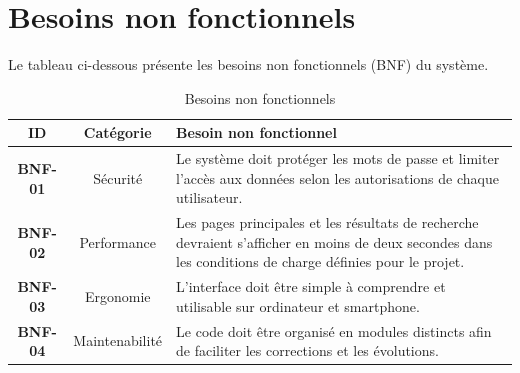\section{Besoins non fonctionnels}

Le tableau ci-dessous présente les besoins non fonctionnels (BNF) du système.

\begin{table}[ht]
\centering
\renewcommand{\arraystretch}{1.25}
\begin{tabularx}{\textwidth}{>{\bfseries}c c X}
\toprule
\textbf{ID} & \textbf{Catégorie} & \textbf{Besoin non fonctionnel} \\
\midrule
BNF-01 & Sécurité & Le système doit protéger les mots de passe et limiter l'accès aux données selon les autorisations de chaque utilisateur. \\
BNF-02 & Performance & Les pages principales et les résultats de recherche devraient s'afficher en moins de deux secondes dans les conditions de charge définies pour le projet. \\
BNF-03 & Ergonomie & L'interface doit être simple à comprendre et utilisable sur ordinateur et smartphone. \\
BNF-04 & Maintenabilité & Le code doit être organisé en modules distincts afin de faciliter les corrections et les évolutions. \\
\bottomrule
\end{tabularx}
\caption{Besoins non fonctionnels}
\end{table}
